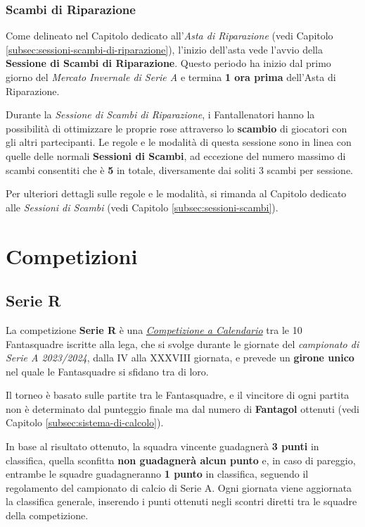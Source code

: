 \documentclass[12pt]{article}
\begin{document}
\subsubsection{Scambi di Riparazione}

Come delineato nel Capitolo dedicato all'\textit{Asta di Riparazione} (vedi Capitolo \ref{subsec:sessioni-scambi-di-riparazione}), l'inizio dell'asta vede l'avvio della \textbf{Sessione di Scambi di Riparazione}. Questo periodo ha inizio dal primo giorno del \textit{Mercato Invernale di Serie A} e termina \textbf{1 ora prima} dell'Asta di Riparazione.

Durante la \textit{Sessione di Scambi di Riparazione}, i Fantallenatori hanno la possibilità di ottimizzare le proprie rose attraverso lo \textbf{scambio} di giocatori con gli altri partecipanti. Le regole e le modalità di questa sessione sono in linea con quelle delle normali \textbf{Sessioni di Scambi}, ad eccezione del numero massimo di scambi consentiti che è \textbf{5} in totale, diversamente dai soliti 3 scambi per sessione.

Per ulteriori dettagli sulle regole e le modalità, si rimanda al Capitolo dedicato alle \textit{Sessioni di Scambi} (vedi Capitolo \ref{subsec:sessioni-scambi}).


\newpage
\section{Competizioni}\label{subsec:competizioni}

\subsection{Serie R}
La competizione \textbf{Serie R} è una \textit{\hyperref[competizione-a-calendario]{Competizione a Calendario}} tra le 10 Fantasquadre iscritte alla lega, che si svolge durante le giornate del \textit{campionato di Serie A 2023/2024}, dalla IV alla XXXVIII giornata, e prevede un \textbf{girone unico} nel quale le Fantasquadre si sfidano tra di loro.

Il torneo è basato sulle partite tra le Fantasquadre, e il vincitore di ogni partita non è determinato dal punteggio finale ma dal numero di \textbf{Fantagol} ottenuti (vedi Capitolo \ref{subsec:sistema-di-calcolo}).

In base al risultato ottenuto, la squadra vincente guadagnerà \textbf{3 punti} in classifica, quella sconfitta \textbf{non guadagnerà alcun punto} e, in caso di pareggio, entrambe le squadre guadagneranno \textbf{1 punto} in classifica, seguendo il regolamento del campionato di calcio di Serie A. Ogni giornata viene aggiornata la classifica generale, inserendo i punti ottenuti negli scontri diretti tra le squadre della competizione.
\end{document}
